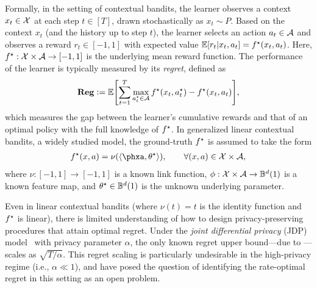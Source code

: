 \documentclass{article}
\begin{document}
Formally, in the setting of contextual bandits, the learner observes a context $x_t\in\mathcal{X}$ at each step $t\in[T]$, drawn stochastically as $x_t\sim P$. Based on the context $x_t$ (and the history up to step $t$), the learner selects an action $a_t\in\mathcal{A}$ and observes a reward $r_t\in[-1,1]$ with expected value $\mathbb{E}[r_t|x_t,a_t]=f^\star(x_t,a_t)$. Here, $f^\star:\mathcal{X}\times\mathcal{A}\to[-1,1]$ is the underlying mean reward function. The performance of the learner is typically measured by its \emph{regret}, defined as
\begin{align*}
    \mathbf{Reg}\mathrel{\mathop:}= \mathbb{E}{\left[  \sum_{t=1}^T \max_{a^\star_t\in\mathcal{A}} f^\star(x_t,a^\star_t) - f^\star(x_t,a_t)  \right]},
\end{align*}
which measures the gap between the learner's cumulative rewards and that of an optimal policy with the full knowledge of $f^\star$.
In generalized linear contextual bandits, a widely studied model, the ground-truth $f^\star$ is assumed to take the form
\begin{align*}
    \fs(x,a)=\nu(\lr \phxa, \ths \rr), \qquad \forall (x,a)\in\cX\times\cA,
\end{align*}
where $\nu:[-1,1]\to[-1,1]$ is a known link function, $\phi:\mathcal{X}\times\mathcal{A}\to\mathbb{B}^d(1)$ is a known feature map, and $\theta^\star\in\mathbb{B}^d(1)$ is the unknown underlying parameter. 

Even in linear contextual bandits (where $\nu(t)=t$ is the identity function and $f^\star$ is linear), there is limited understanding of how to design privacy-preserving procedures that attain optimal regret.
Under the \emph{joint differential privacy} (JDP) model~\citep{dwork2006calibrating} with privacy parameter $\alpha$, the only known regret upper bound---due to \citet{shariff2018differentially}---scales as $\sqrt{T/\alpha}$. This regret scaling is particularly undesirable in the high-privacy regime (i.e., $\alpha \ll 1$), and \citet{azize2024open} have posed the question of identifying the rate-optimal regret in this setting as an open problem.


\end{document}

